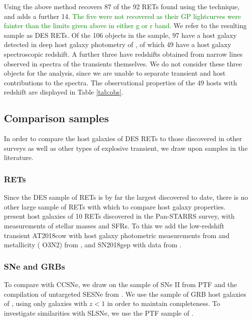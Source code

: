 \documentclass[fleqn,usenatbib,]{mnras}
\begin{document}
Using the above method recovers 87 of the 92 RETs found using the  technique, and adds a further 14. \textcolor{green}{The five were not recovered as their GP lightcurves were fainter than the limits given above in either g or r band.}
We refer to the resulting sample as DES RETs. Of the 106 objects in the sample, 97 have a host galaxy detected in deep host galaxy photometry of \citet{Wiseman2020}, of which 49 have a host galaxy spectroscopic redshift. A further three have redshifts obtained from narrow lines observed in spectra of the transients themselves. We do not consider these three objects for the analysis, since we are unable to separate transient and host contributions to the spectra. The observational properties of the 49 hosts with redshift are displayed in Table \ref{tab:obs}.

\subsection{Comparison samples \label{subsec:comparison}}

In order to compare the host galaxies of DES RETs to those discovered in other surveys as well as other types of explosive transient, we draw upon samples in the literature. 

\subsubsection{RETs \label{subsubsec:compare_rets}}
Since the DES sample of RETs is by far the largest discovered to date, there is no other large sample of RETs with which to compare host galaxy properties. \citet{Drout2014} present host galaxies of 10 RETs discovered in the Pan-STARRS survey, with measurements of stellar masses and SFRs. To this we add the low-redshift transient AT2018cow with host galaxy photometric measurements from \citet{Perley2019} and metallicity (\citealt{Pettini2004} O3N2) from \citet{Morokuma-Matsui}, and SN2018gep with data from \citet{Ho2019}.

\subsubsection{SNe and GRBs \label{subsubsec:compare_CCSNe}}

To compare with CCSNe, we draw on the sample of SNe II from PTF \citep{Stoll2013} and the compilation of untargeted SESNe from \citet{Sanders2012}. We use the sample of GRB host galaxies of \citet{Kruehler2015}, using only galaxies with $z<1$ in order to maintain completeness. To investigate similarities with SLSNe, we use the PTF sample of \citet{Perley2016c}.
\end{document}
